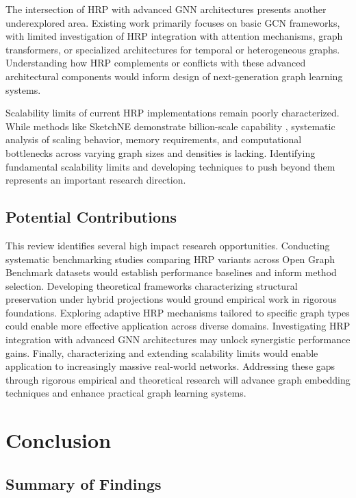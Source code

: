 \documentclass[conference]{IEEEtran}
\begin{document}
The intersection of HRP with advanced GNN architectures presents another underexplored area. Existing work primarily focuses on basic GCN frameworks, with limited investigation of HRP integration with attention mechanisms, graph transformers, or specialized architectures for temporal or heterogeneous graphs. Understanding how HRP complements or conflicts with these advanced architectural components would inform design of next-generation graph learning systems.

Scalability limits of current HRP implementations remain poorly characterized. While methods like SketchNE demonstrate billion-scale capability \cite{xie2023sketchne}, systematic analysis of scaling behavior, memory requirements, and computational bottlenecks across varying graph sizes and densities is lacking. Identifying fundamental scalability limits and developing techniques to push beyond them represents an important research direction.

\subsection{Potential Contributions}

This review identifies several high impact research opportunities. Conducting systematic benchmarking studies comparing HRP variants across Open Graph Benchmark datasets would establish performance baselines and inform method selection. Developing theoretical frameworks characterizing structural preservation under hybrid projections would ground empirical work in rigorous foundations. Exploring adaptive HRP mechanisms tailored to specific graph types could enable more effective application across diverse domains. Investigating HRP integration with advanced GNN architectures may unlock synergistic performance gains. Finally, characterizing and extending scalability limits would enable application to increasingly massive real-world networks. Addressing these gaps through rigorous empirical and theoretical research will advance graph embedding techniques and enhance practical graph learning systems.

\section{Conclusion}

\subsection{Summary of Findings}
\end{document}
